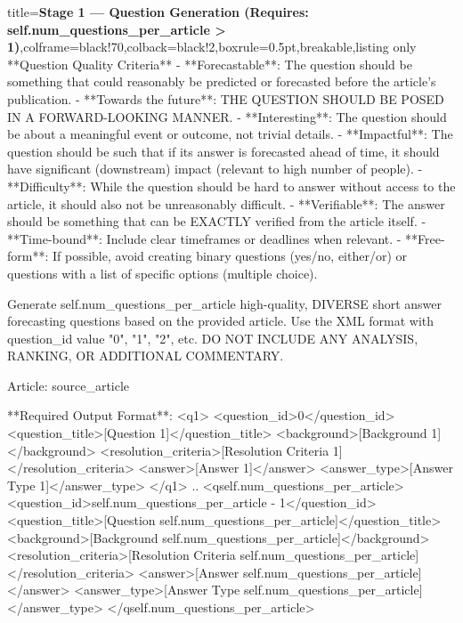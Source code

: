 \begin{tcblisting}{title={\textbf{Stage 1 --- Question Generation (Requires:  self.num\_questions\_per\_article > 1)}},colframe=black!70,colback=black!2,boxrule=0.5pt,breakable,listing only}
**Question Quality Criteria**
- **Forecastable**: The question should be something that could reasonably be predicted or forecasted before the article's publication.
- **Towards the future**: THE QUESTION SHOULD BE POSED IN A FORWARD-LOOKING MANNER.
- **Interesting**: The question should be about a meaningful event or outcome, not trivial details.
- **Impactful**: The question should be such that if its answer is forecasted ahead of time, it should have significant (downstream) impact (relevant to high number of people).
- **Difficulty**: While the question should be hard to answer without access to the article, it should also not be unreasonably difficult.
- **Verifiable**: The answer should be something that can be EXACTLY verified from the article itself.
- **Time-bound**: Include clear timeframes or deadlines when relevant.
- **Free-form**: If possible, avoid creating binary questions (yes/no, either/or) or questions with a list of specific options (multiple choice).

Generate {self.num_questions_per_article} high-quality, DIVERSE short answer forecasting questions based on the provided article. Use the XML format with question_id value "0", "1", "2", etc. DO NOT INCLUDE ANY ANALYSIS, RANKING, OR ADDITIONAL COMMENTARY.

Article:
{source_article}

**Required Output Format**:
<q1>
<question_id>0</question_id>
<question_title>[Question 1]</question_title>
<background>[Background 1]</background>
<resolution_criteria>[Resolution Criteria 1]</resolution_criteria>
<answer>[Answer 1]</answer>
<answer_type>[Answer Type 1]</answer_type>
</q1>
..
<q{self.num_questions_per_article}>
<question_id>{self.num_questions_per_article - 1}</question_id>
<question_title>[Question {self.num_questions_per_article}]</question_title>
<background>[Background {self.num_questions_per_article}]</background>
<resolution_criteria>[Resolution Criteria {self.num_questions_per_article}]</resolution_criteria>
<answer>[Answer {self.num_questions_per_article}]</answer>
<answer_type>[Answer Type {self.num_questions_per_article}]</answer_type>
</q{self.num_questions_per_article}>
\end{tcblisting}



